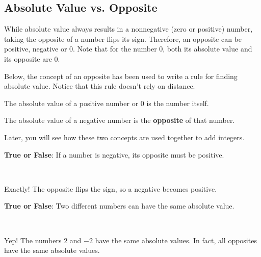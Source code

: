 \documentclass{ximera}[font=12pt]
\begin{document}
\subsection*{Absolute Value vs. Opposite}

While absolute value always results in a nonnegative (zero or positive) number, taking the opposite of a number flips its sign. Therefore, an opposite can be positive, negative or 0. Note that for the number 0, both its absolute value and its opposite are 0.

Below, the concept of an opposite has been used to write a rule for finding absolute value.  Notice that this rule doesn't rely on distance.

\begin{procedure}
\begin{description}[style=nextline, leftmargin=0pt, font=\bfseries]
    \item[Positive Numbers and 0]
    The absolute value of a positive number or 0 is the number itself.
    \item[Negative Numbers]
    The absolute value of a negative number is the \textbf{opposite} of that number.
\end{description}
\end{procedure}

Later, you will see how these two concepts are used together to add integers.

\begin{problem}
\textbf{True or False}: If a number is negative, its opposite must be positive.

~ \\[2em]

\begin{multipleChoice}
\end{multipleChoice}


\begin{feedback}[correct]
Exactly! The opposite flips the sign, so a negative becomes positive.
\end{feedback}

\end{problem}

\begin{problem}
\textbf{True or False}: Two different numbers can have the same absolute value.

~ \\[2em]

\begin{multipleChoice}
\end{multipleChoice}

\begin{feedback}[correct]
Yep! The numbers $2$ and $-2$ have the same absolute values.  In fact, all opposites have the same absolute values.
\end{feedback}

\end{problem}
\end{document}
